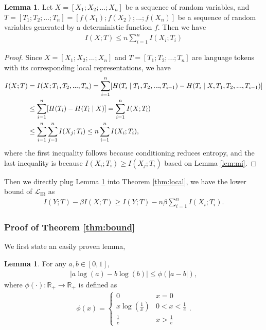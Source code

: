 \documentclass{article} \usepackage{iclr2021_conference,times}
\newcommand{\R}{\mathbb{R}}
\theoremstyle{definition}
\newtheorem{lemma}[theorem]{Lemma}
\theoremstyle{remark}
\newcommand{\modified}[1]{{\color{black}{#1}}}
\begin{document}
\begin{lemma} \label{lem:local} Let $X=[X_1; X_2; ...; X_n]$ be a sequence of random variables, and $T=[T_1; T_2; ...; T_n]=[f(X_1); f(X_2); ...; f(X_n)]$ be a sequence of random variables generated by a deterministic function $f$.  Then we have 
\begin{align}
    I(X;T) \le n \sum_{i=1}^n I(X_i;T_i)
\end{align}

\end{lemma}
\begin{proof}
Since $X=[X_1;X_2;...;X_n]$ and $T=[T_1;T_2;...;T_n]$ are language tokens with its corresponding local representations, we have 
\begin{align}
    I(X;T) &= I(X; T_1, T_2, ..., T_n) = \modified{\sum_{i=1}^n[H(T_i \mid T_1, T_2,..., T_{i-1}) - H(T_i \mid X, T_1, T_2, ..., T_{i-1})]} \\
    &\le \sum_{i=1}^n [ H(T_i) - H(T_i \mid X)] = \sum_{i=1}^n I(X; T_i) \\
    &\le \sum_{i=1}^n \sum_{j=1}^n I(X_j; T_i) \le n \sum_{i=1}^n I(X_i; T_i),
\end{align}
where the first inequality follows because conditioning reduces entropy, and the last inequality is because $I(X_i; T_i) \ge I(X_j; T_i) $ based on Lemma \ref{lem:mi}.
\end{proof}
Then we directly plug Lemma \ref{lem:local} into Theorem \ref{thm:local}, we have the lower bound of $\mathcal{L}_{\text{IB}}$ as
\begin{align}
 I(Y; T) - \beta I(X; T) \ge I(Y; T) - n\beta \sum_{i=1}^{n} I(X_i; T_i).    
\end{align}

\subsubsection{Proof of Theorem \ref{thm:bound}}
We first state an easily proven lemma,

\begin{lemma} \label{lem:phi} For any $a, b \in [0,1]$,  \begin{align}
    |a\log(a) - b \log(b)| \le \phi(|a-b|),
\end{align}
where $\phi(\cdot): \R_+ \rightarrow \R_+$ is defined as
\begin{align}
    \phi(x) = 
\begin{cases}
    0              &  x =0 \\
    x \log(\frac{1}{x}) & 0 < x < \frac{1}{e} \\
    \frac{1}{e}     &  x > \frac{1}{e}
\end{cases}.
\end{align}
\end{lemma}
\end{document}
